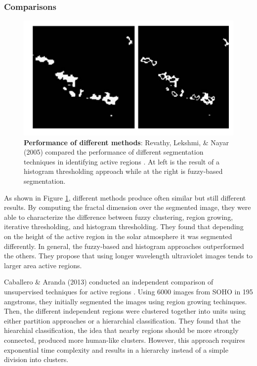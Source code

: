 \documentclass[twoside]{report}
\begin{document}
\subsubsection{Comparisons}
\begin{figure}[ht]
  \begin{center}
    \includegraphics[scale=1]{revathy.png}
    \caption{{\bf Performance of different methods}: Revathy, Lekshmi, \& Nayar (2005) compared the performance of different segmentation techniques in identifying active regions \cite{revathy}. At left is the result of a histogram thresholding approach while at the right is fuzzy-based segmentation. }
    \label{fig:revathy}
 \end{center}
\end{figure}

As shown in Figure \ref{fig:revathy}, different methods produce often similar but still different results. By computing the fractal dimension over the segmented image, they were able to characterize the difference between fuzzy clustering, region growing, iterative thresholding, and histogram thresholding. They found that depending on the height of the active region in the solar atmosphere it was segmented differently. In general, the fuzzy-based and histogram approaches outperformed the others. They propose that using longer wavelength ultraviolet images tends to larger area active regions.

Caballero \& Aranda (2013) conducted an independent comparison of unsupervised techniques for active regions \cite{caballero}. Using 6000 images from SOHO in 195 angstroms, they initially segmented the images using region growing techinques. Then, the different independent regions were clustered together into units using either partition approaches or a hierarchial classification. They found that the hiearchial classification, the idea that nearby regions should be more strongly connected, produced more human-like clusters. However, this approach requires exponential time complexity and results in a hierarchy instead of a simple division into clusters.
\end{document}
